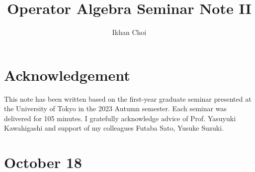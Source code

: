 \documentclass{../../../small}
\begin{document}
\title{Operator Algebra Seminar Note II}
\author{Ikhan Choi}
\maketitle
\tableofcontents


\section*{Acknowledgement}
This note has been written based on the first-year graduate seminar presented at the University of Tokyo in the 2023 Autumn semester.
Each seminar was delivered for 105 minutes.
I gratefully acknowledge advice of Prof. Yasuyuki Kawahigashi and support of my colleagues Futaba Sato, Yusuke Suzuki.



\newpage
\section{October 18}
\end{document}
